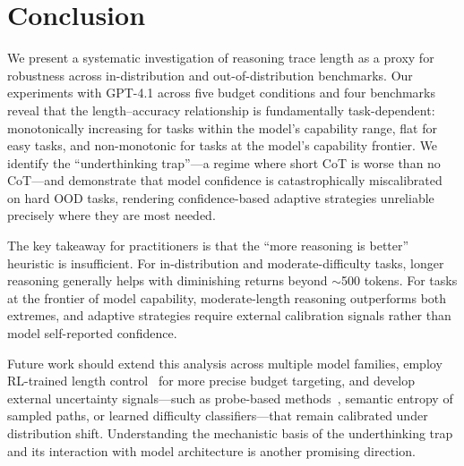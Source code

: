 \section{Conclusion}
\label{sec:conclusion}

We present a systematic investigation of reasoning trace length as a proxy for robustness across in-distribution and out-of-distribution benchmarks. Our experiments with GPT-4.1 across five budget conditions and four benchmarks reveal that the length--accuracy relationship is fundamentally task-dependent: monotonically increasing for tasks within the model's capability range, flat for easy tasks, and non-monotonic for tasks at the model's capability frontier. We identify the ``underthinking trap''---a regime where short CoT is worse than no CoT---and demonstrate that model confidence is catastrophically miscalibrated on hard OOD tasks, rendering confidence-based adaptive strategies unreliable precisely where they are most needed.

The key takeaway for practitioners is that the ``more reasoning is better'' heuristic is insufficient. For in-distribution and moderate-difficulty tasks, longer reasoning generally helps with diminishing returns beyond ${\sim}$500 tokens. For tasks at the frontier of model capability, moderate-length reasoning outperforms both extremes, and adaptive strategies require external calibration signals rather than model self-reported confidence.

Future work should extend this analysis across multiple model families, employ RL-trained length control~\citep{aggarwal2025l1} for more precise budget targeting, and develop external uncertainty signals---such as probe-based methods~\citep{bogdan2025anchors}, semantic entropy of sampled paths, or learned difficulty classifiers---that remain calibrated under distribution shift. Understanding the mechanistic basis of the underthinking trap and its interaction with model architecture is another promising direction.
